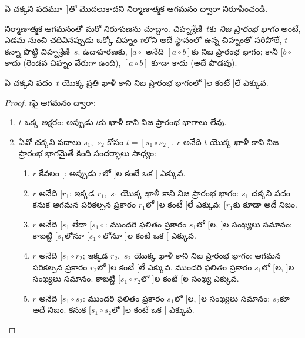 \documentclass[../../../include/open-logic-section]{subfiles}
\begin{document}
\begin{prob}
  ఏ చక్కని పదమూ~$]$తో మొదలుకాదని నిర్మాణాత్మక ఆగమనం ద్వారా నిరూపించండి.
\end{prob}

నిర్మాణాత్మక ఆగమనంతో మరో నిరూపణను చూద్దాం. చిహ్నశ్రేణి~$t$కు \emph{నిజ ప్రారంభ భాగం} అంటే, ఎడమ నుంచి చదివినప్పుడు ఒక్కో చిహ్నం $t$లోని అదే స్థానంలో
ఉన్న చిహ్నంతో సరిపోలే, $t$ కన్నా పొట్టి చిహ్నశ్రేణి~$s$. ఉదాహరణకు, $[a \circ {}$ అనేది $[a \circ b]$కు నిజ ప్రారంభ భాగం; కానీ $[b \circ {}$ కాదు (రెండవ చిహ్నం వేరుగా ఉంది), $[a
\circ b]$ కూడా కాదు (అదే పొడవు).

\begin{prop}
  ఏ చక్కని పదం~$t$ యొక్క ప్రతి ఖాళీ కాని నిజ ప్రారంభ భాగంలో $]$ల కంటే
    $[$లే ఎక్కువ.
\end{prop}

\begin{proof}
  $t$పై ఆగమనం ద్వారా:
  \begin{enumerate}
  \item $t$ ఒక్క అక్షరం: అప్పుడు $t$కు ఖాళీ కాని నిజ ప్రారంభ భాగాలు లేవు.
  \item ఏవో చక్కని పదాలు $s_1$,~$s_2$ కోసం $t = [s_1 \circ s_2]$. $r$ అనేది $t$ యొక్క ఖాళీ కాని నిజ ప్రారంభ భాగమైతే కింది సందర్భాలు సాధ్యం:
    \begin{enumerate}
    \item $r$ కేవలం $[$: అప్పుడు $r$లో $]$ల కంటే ఒక $[$ ఎక్కువ.
    \item $r$ అనేది $[r_1$; ఇక్కడ $r_1$,~$s_1$ యొక్క ఖాళీ కాని నిజ ప్రారంభ భాగం: $s_1$ చక్కని పదం కనుక ఆగమన పరికల్పన ప్రకారం $r_1$లో $]$ల కంటే $[$లే ఎక్కువ; $[r_1$కు కూడా అదే నిజం.
    \item $r$ అనేది $[s_1$ లేదా $[s_1 \circ {}$: ముందరి ఫలితం ప్రకారం $s_1$లో $[$ల, $]$ల సంఖ్యలు సమానం; కాబట్టి $[s_1$లోనూ $[s_1 \circ {}$లోనూ $]$ల కంటే ఒక $[$ ఎక్కువ.
    \item $r$ అనేది $[s_1 \circ r_2$; ఇక్కడ $r_2$,~$s_2$ యొక్క ఖాళీ కాని నిజ ప్రారంభ భాగం: ఆగమన పరికల్పన ప్రకారం $r_2$లో $]$ల కంటే $[$లే ఎక్కువ. ముందరి ఫలితం ప్రకారం $s_1$లో $[$ల, $]$ల సంఖ్యలు సమానం. కాబట్టి $[s_1 \circ r_2$లో $]$ల కంటే $[$ల సంఖ్య ఎక్కువ.
    \item $r$ అనేది $[s_1 \circ s_2$: ముందరి ఫలితం ప్రకారం $s_1$లో $[$ల, $]$ల సంఖ్యలు సమానం; $s_2$కూ అదే నిజం. కనుక $[s_1 \circ s_2$లో $]$ల కంటే ఒక $[$ ఎక్కువ.
    \end{enumerate}
  \end{enumerate}
\end{proof}
\end{document}
